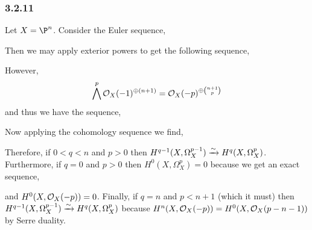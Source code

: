 \documentclass[12pt]{article}
\begin{document}
\subsubsection{3.2.11}

Let $X = \P^n$. Consider the Euler sequence,
\begin{center}
\end{center}
Then we may apply exterior powers to get the following sequence,
\begin{center}
\end{center}
However, 
\[ \bigwedge^p \mathcal{O}_{X}(-1)^{\oplus (n+1)} = \mathcal{O}_{X}(-p)^{\oplus { n + 1 \choose p }} \] 
and thus we have the sequence,
\begin{center}
\end{center}
Now applying the cohomology sequence we find,
\begin{center}
\end{center}
Therefore, if $0 < q < n$ and $p > 0$ then $H^{q-1}(X, \Omega^{p-1}_{X}) \xrightarrow{\sim} H^q(X, \Omega^p_{X})$. Furthermore, if $q = 0$ and $p > 0$ then $H^0(X, \Omega^p_{X}) = 0$ because we get an exact sequence,
\begin{center}
\end{center}
and $H^0(X, \mathcal{O}_{X}(-p)) = 0$. Finally, if $q = n$ and $p < n + 1$ (which it must) then $H^{q-1}(X, \Omega_X^{p-1}) \xrightarrow{\sim} H^q(X, \Omega_X^p)$ because $H^n(X, \mathcal{O}_{X}(-p)) = H^0(X, \mathcal{O}_{X}(p - n - 1))$ by Serre duality.
\end{document}
